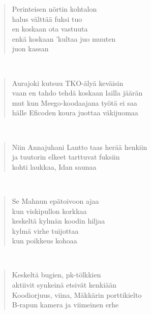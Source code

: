 \noindent\begin{minipage}{\linewidth}
\begin{verse}
	Perinteisen nörtin kohtalon\\
	halus välttää fuksi tuo\\
	en koskaan ota vastuuta\\
	enkä koskaan 'kultaa juo muuten\\
	juon kassan\\
\end{verse}
\end{minipage}\\[10pt]
\noindent\begin{minipage}{\linewidth}
\begin{verse}
	Aurajoki kutsuu TKO-älyä keväisin\\
	vaan en tahdo tehdä koskaan lailla jäärän\\
	mut kun Meego-koodaajana työtä ei saa\\
	hälle Eficoden koura juottaa väkijuomaa\\
\end{verse}
\end{minipage}\\[10pt]
\noindent\begin{minipage}{\linewidth}
\begin{verse}
	Niin Annajuhani Lantto taas herää henkiin\\
	ja tuutorin elkeet tarttuvat fuksiin\\
	kohti laukkaa, Idan saunaa\\
\end{verse}
\end{minipage}\\[10pt]
\noindent\begin{minipage}{\linewidth}
\begin{verse}
	Se Mahnun epätoivoon ajaa\\
	kun viskipullon korkkaa\\
	keskeltä kylmän koodin hiljaa\\
	kylmä virhe tuijottaa\\
	kun poikkeus kohoaa\\
\end{verse}
\end{minipage}\\[10pt]
\noindent\begin{minipage}{\linewidth}
\begin{verse}
	Keskeltä bugien, pk-tölkkien\\
	aktiivit synkeinä etsivät kenkiään\\
	Koodiorjuus, viina, Mäkkärin porttikielto\\
	B-rapun kamera ja viimeinen erhe\\
\end{verse}
\end{minipage}\\[10pt]

